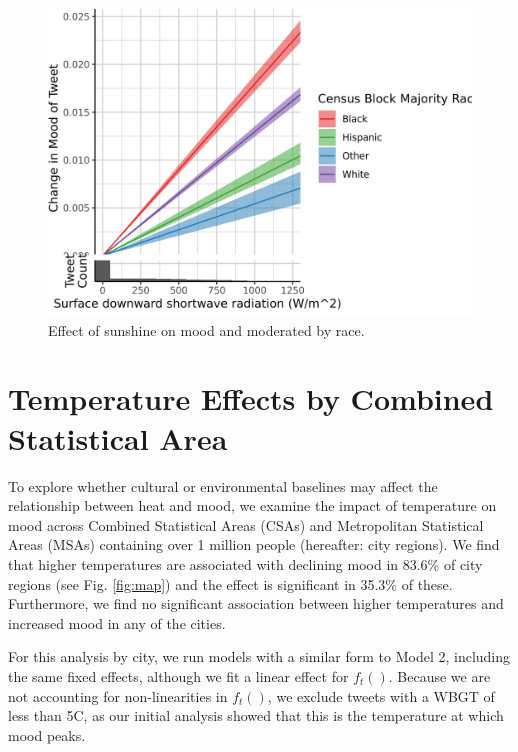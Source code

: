 \documentclass{article}
\begin{document}
\begin{figure}[H]
  \centering
  \includegraphics[width=0.6\linewidth]{../res/srad-race_q.png}
  \caption{Effect of sunshine on mood and moderated by race.}
  \label{fig:timeseries}
\end{figure}

\newpage
\section*{Temperature Effects by Combined Statistical Area}
To explore whether cultural or environmental baselines may affect the relationship between heat and mood, we examine the impact of temperature on mood across Combined Statistical Areas (CSAs) and Metropolitan Statistical Areas (MSAs) containing over 1 million people (hereafter: city regions). We find that higher temperatures are associated with declining mood in 83.6\% of city regions (see Fig. \ref{fig:map}) and the effect is significant in 35.3\% of these. Furthermore, we find no significant association between higher temperatures and increased mood in any of the cities.

For this analysis by city, we run models with a similar form to Model 2, including the same fixed effects, although we fit a linear effect for $f_t()$.  Because we are not accounting for non-linearities in $f_t()$, we exclude tweets with a WBGT of less than 5\textdegree C, as our initial analysis showed that this is the temperature at which mood peaks.
\end{document}
